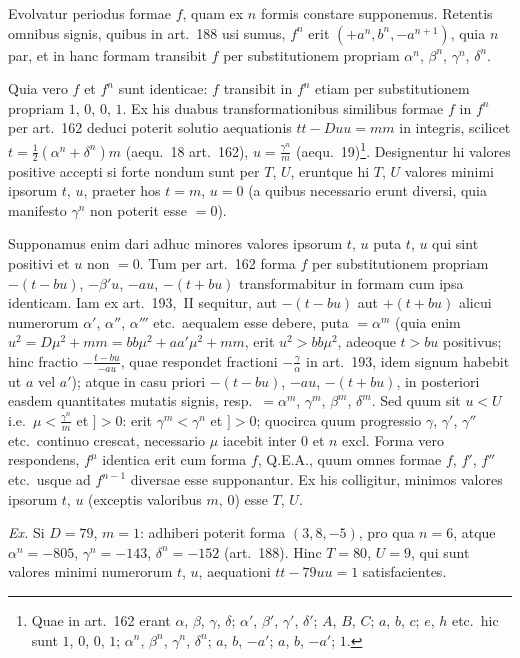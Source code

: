 \documentclass[12pt,a4paper]{article}
\theoremstyle{plain}
\begin{document}
Evolvatur periodus formae $f$, quam ex $n$ formis constare supponemus. Retentis omnibus signis, quibus in art.~188 usi sumus, $f^n$ erit $(+a^n, b^n, -a^{n+1})$, quia $n$ par, et in hanc formam transibit $f$ per substitutionem propriam $\alpha^n$, $\beta^n$, $\gamma^n$, $\delta^n$.

Quia vero $f$ et $f^n$ sunt identicae: $f$ transibit in $f^n$ etiam per substitutionem propriam $1$, $0$, $0$, $1$. Ex his duabus transformationibus similibus formae $f$ in $f^n$ per art.~162 deduci poterit solutio aequationis $tt - Duu = mm$ in integris, scilicet $t = \frac{1}{2}(\alpha^n + \delta^n)m$ (aequ.~18 art.~162), $u = \frac{\gamma^n}{m}$ (aequ.~19)\footnote{Quae in art.~162 erant $\alpha$, $\beta$, $\gamma$, $\delta$; $\alpha'$, $\beta'$, $\gamma'$, $\delta'$; $A$, $B$, $C$; $a$, $b$, $c$; $e$, $h$ etc.~hic sunt $1$, $0$, $0$, $1$; $\alpha^n$, $\beta^n$, $\gamma^n$, $\delta^n$; $a$, $b$, $-a'$; $a$, $b$, $-a'$; $1$.}. Designentur hi valores positive accepti si forte nondum sunt per $T$, $U$, eruntque hi $T$, $U$ valores minimi ipsorum $t$, $u$, praeter hos $t = m$, $u = 0$ (a quibus necessario erunt diversi, quia manifesto $\gamma^n$ non poterit esse $= 0$).

Supponamus enim dari adhuc minores valores ipsorum $t$, $u$ puta $t$, $u$ qui sint positivi et $u$ non $= 0$. Tum per art.~162 forma $f$ per substitutionem propriam $-(t - bu)$, $-\beta' u$, $-au$, $-(t + bu)$ transformabitur in formam cum ipsa identicam. Iam ex art.~193,~II sequitur, aut $-(t - bu)$ aut $+(t + bu)$ alicui numerorum $\alpha'$, $\alpha''$, $\alpha'''$ etc.~aequalem esse debere, puta $= \alpha^m$ (quia enim $u^2 = D\mu^2 + mm = bb\mu^2 + aa'\mu^2 + mm$, erit $u^2 > bb\mu^2$, adeoque $t > bu$ positivus; hinc fractio $-\frac{t - bu}{-au}$, quae respondet fractioni $-\frac{\gamma}{\alpha}$ in art.~193, idem signum habebit ut $a$ vel $a'$); atque in casu priori $-(t - bu)$, $-au$, $-(t + bu)$, in posteriori easdem quantitates mutatis signis, resp.~$= \alpha^m$, $\gamma^m$, $\beta^m$, $\delta^m$. Sed quum sit $u < U$ i.e.~$\mu < \frac{\gamma^n}{m}$ et $] > 0$: erit $\gamma^m < \gamma^n$ et $] > 0$; quocirca quum progressio $\gamma$, $\gamma'$, $\gamma''$ etc.~continuo crescat, necessario $\mu$ iacebit inter $0$ et $n$ excl. Forma vero respondens, $f^\mu$ identica erit cum forma $f$, Q.E.A., quum omnes formae $f$, $f'$, $f''$ etc.~usque ad $f^{n-1}$ diversae esse supponantur. Ex his colligitur, minimos valores ipsorum $t$, $u$ (exceptis valoribus $m$, $0$) esse $T$, $U$.

\textit{Ex.} Si $D = 79$, $m = 1$: adhiberi poterit forma $(3, 8, -5)$, pro qua $n = 6$, atque $\alpha^n = -805$, $\gamma^n = -143$, $\delta^n = -152$ (art.~188). Hinc $T = 80$, $U = 9$, qui sunt valores minimi numerorum $t$, $u$, aequationi $tt - 79uu = 1$ satisfacientes.
\end{document}
